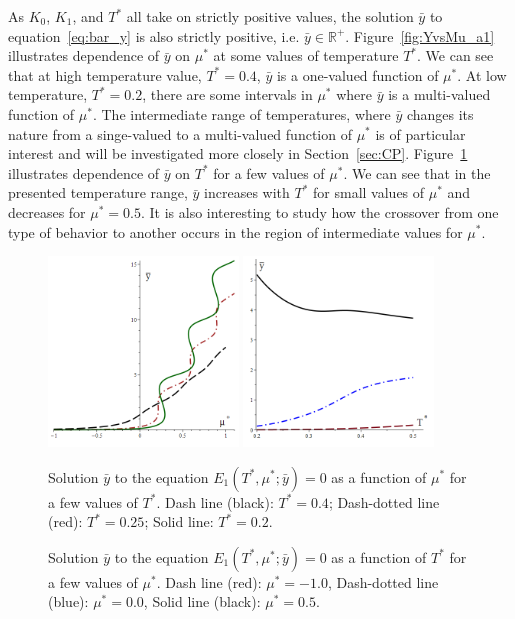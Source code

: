 \documentclass[12pt]{article}
\numberwithin{equation}{section}
\begin{document}
	As $K_0$, $K_1$, and $T^*$ all take on strictly positive values, the solution $\bar{y}$ to equation~\eqref{eq:bar_y} is also strictly positive, i.e. $\bar{y} \in \mathbb{R}^{+}$.
	Figure~\ref{fig:YvsMu_a1} illustrates dependence of $\bar{y}$ on $\mu^*$ at some values of temperature $T^*$. We can see that at high temperature value, $T^*=0.4$, $\bar{y}$ is a one-valued function of $\mu^*$. At low temperature, $T^*=0.2$, there are some intervals in $\mu^*$ where $\bar{y}$ is a multi-valued function of $\mu^*$. The intermediate range of temperatures, where $\bar{y}$ changes its nature from a singe-valued to a multi-valued function of $\mu^*$ is of particular interest and will be investigated more closely in Section~\ref{sec:CP}. Figure~\ref{fig:YvsT_a2} illustrates dependence of $\bar{y}$ on $T^*$ for a few values of $\mu^*$. We can see that in the presented temperature range, $\bar{y}$ increases with $T^*$ for small values of $\mu^*$ and decreases for $\mu^*=0.5$. It is also interesting to study how the crossover from one type of behavior to another occurs in the region of intermediate values for $\mu^*$.
	
	\begin{figure}[htbp]
		\includegraphics[width=0.45\textwidth,angle=0]{images/YvsMu_a1}
		\hfill
		\includegraphics[width=0.45\textwidth,angle=0]{images/YvsT_a2}
		\\
		\parbox{0.45\textwidth}{\caption{\label{fig:YvsMu_a1} Solution $\bar{y}$ to the equation $E_1(T^*,\mu^*;\bar{y})=0$ as a function of $\mu^*$ for a few values of $T^*$. Dash line (black): $T^* = 0.4$; Dash-dotted line (red): $T^* = 0.25$; Solid line: $T^*=0.2$.}}
		\hfill
		\parbox{0.45\textwidth}{\caption{\label{fig:YvsT_a2} Solution $\bar{y}$ to the equation $E_1(T^*,\mu^*;\bar{y})=0$ as a function of $T^*$ for a few values of $\mu^*$. Dash line (red): $\mu^* = -1.0$, Dash-dotted line (blue): $\mu^* = 0.0$, Solid line (black): $\mu^* = 0.5$.}}
	\end{figure}
	
\end{document}
